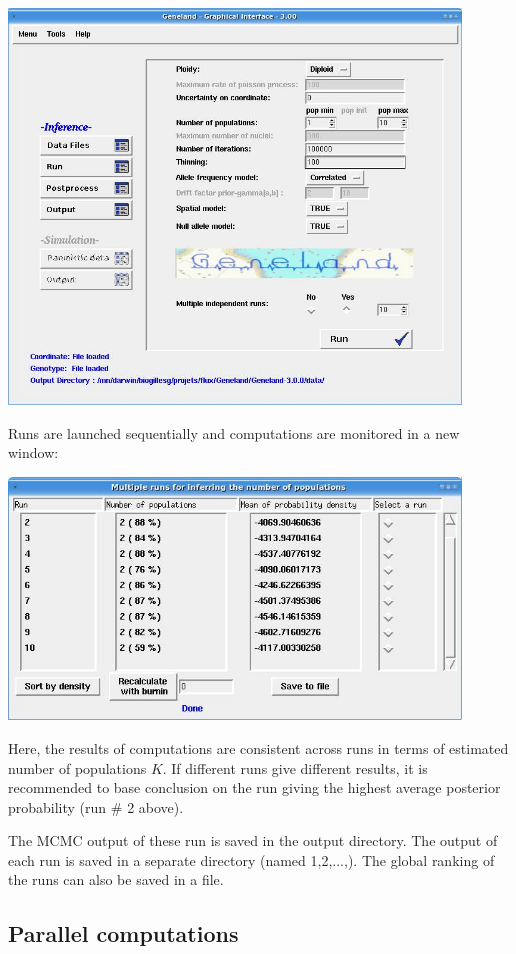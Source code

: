 \documentclass[a4paper,10pt]{article}
\begin{document}
\centerline{\includegraphics[width=12cm]{./fig/multip_run.jpg}}

\newpage
Runs are launched sequentially and computations are monitored in a new window:
\\
\bigskip

\centerline{\includegraphics[width=12cm]{./fig/multip_run2.jpg}}


\bigskip

Here, the results of computations are consistent across runs in terms of estimated number of populations $K$. 
If different runs give different results, it is recommended to base conclusion on the run giving the highest average posterior 
probability (run $\#$ 2 above).

The MCMC output of these run is saved in the output directory. The output of each run is saved in a separate directory (named 1,2,...,).
The global ranking of the runs can also be saved in a file. 


\subsection{Parallel computations}
\end{document}
